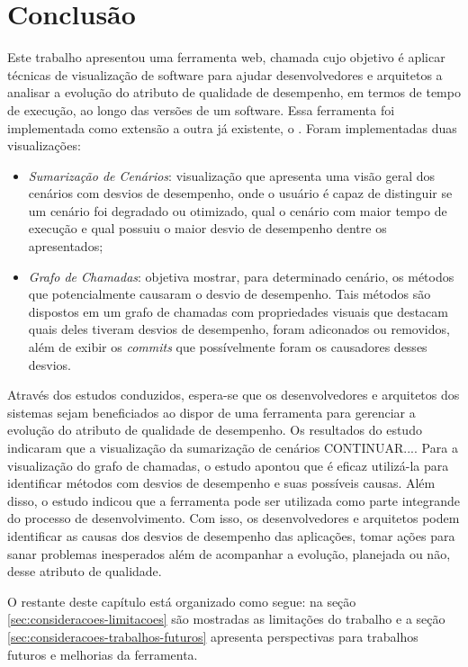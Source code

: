 \chapter{Conclusão} \label{ch:conclusao}

Este trabalho apresentou uma ferramenta web, chamada \textit{\toolName} cujo objetivo é aplicar técnicas de visualização de software para ajudar desenvolvedores e arquitetos a analisar a evolução do atributo de qualidade de desempenho, em termos de tempo de execução, ao longo das versões de um software. Essa ferramenta foi implementada como extensão a outra já existente, o \textit{\perfMinerName}. Foram implementadas duas visualizações:
\begin{itemize}
	\item \textit{Sumarização de Cenários}: visualização que apresenta uma visão geral dos cenários com desvios de desempenho, onde o usuário é capaz de distinguir se um cenário foi degradado ou otimizado, qual o cenário com maior tempo de execução e qual possuiu o maior desvio de desempenho dentre os apresentados;
	\item \textit{Grafo de Chamadas}: objetiva mostrar, para determinado cenário, os métodos que potencialmente causaram o desvio de desempenho. Tais métodos são dispostos em um grafo de chamadas com propriedades visuais que destacam quais deles tiveram desvios de desempenho, foram adiconados ou removidos, além de exibir os \textit{commits} que possívelmente foram os causadores desses desvios.
\end{itemize}

Através dos estudos conduzidos, espera-se que os desenvolvedores e arquitetos dos sistemas sejam beneficiados ao dispor de uma ferramenta para gerenciar a evolução do atributo de qualidade de desempenho. Os resultados do estudo indicaram que a visualização da sumarização de cenários {\color{red}CONTINUAR...}. Para a visualização do grafo de chamadas, o estudo apontou que é eficaz utilizá-la para identificar métodos com desvios de desempenho e suas possíveis causas. Além disso, o estudo indicou que a ferramenta pode ser utilizada como parte integrande do processo de desenvolvimento. Com isso, os desenvolvedores e arquitetos podem identificar as causas dos desvios de desempenho das aplicações, tomar ações para sanar problemas inesperados além de acompanhar a evolução, planejada ou não, desse atributo de qualidade.

O restante deste capítulo está organizado como segue: na seção \ref{sec:consideracoes-limitacoes} são mostradas as limitações do trabalho e a seção \ref{sec:consideracoes-trabalhos-futuros} apresenta perspectivas para trabalhos futuros e melhorias da ferramenta.


